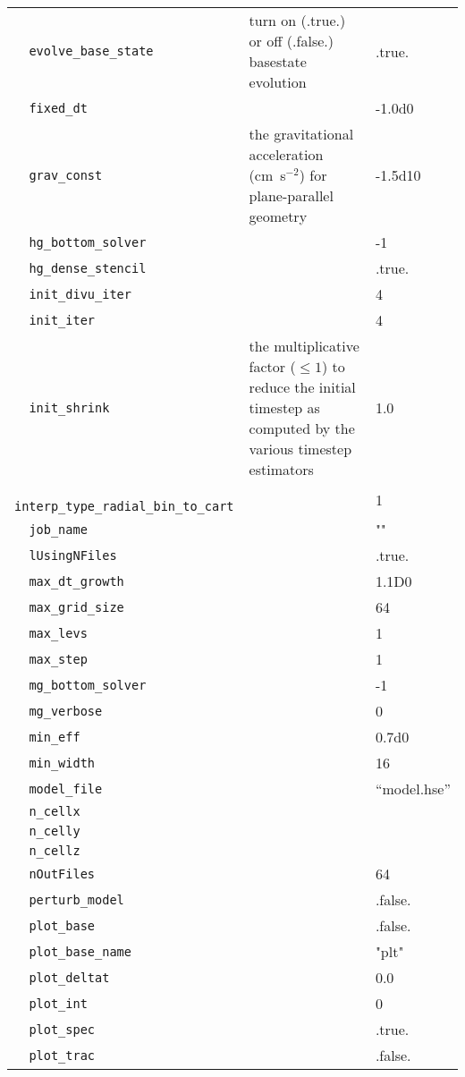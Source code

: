 {\begin{center}
\begin{longtable}{|l|p{3.25in}|l|}
\verb=  evolve_base_state =  & turn on (.true.) or off (.false.) basestate evolution  &  .true. \\
\verb=  fixed_dt =  &   &  -1.0d0 \\
\verb=  grav_const =  & the gravitational acceleration (cm~s$^{-2}$) for plane-parallel geometry  &  -1.5d10 \\
\verb=  hg_bottom_solver =  &   &  -1 \\
\verb=  hg_dense_stencil =  &   &  .true. \\
\verb=  init_divu_iter =  &   &  4 \\
\verb=  init_iter =  &   &  4 \\
\verb=  init_shrink =  & the multiplicative factor ($\le 1$) to reduce the initial timestep as computed by the various timestep estimators   &  1.0 \\
\verb=  interp_type_radial_bin_to_cart =  &   &  1 \\
\verb=  job_name =  &   &  "" \\
\verb=  lUsingNFiles =  &   &  .true. \\
\verb=  max_dt_growth =  &   &  1.1D0 \\
\verb=  max_grid_size =  &   &  64 \\
\verb=  max_levs =  &   &  1 \\
\verb=  max_step =  &   & 1 \\
\verb=  mg_bottom_solver =  &   &  -1 \\
\verb=  mg_verbose =  &   &  0 \\
\verb=  min_eff =  &   &  0.7d0 \\
\verb=  min_width =  &   &  16 \\
\verb=  model_file =  &   & ``model.hse'' \\
\verb=  n_cellx =  &   &  \\
\verb=  n_celly =  &   &  \\
\verb=  n_cellz =  &   &  \\
\verb=  nOutFiles =  &   & 64 \\
\verb=  perturb_model =  &   &  .false. \\
\verb=  plot_base =  &   & .false. \\
\verb=  plot_base_name =  &   &  "plt" \\
\verb=  plot_deltat =  &   &  0.0 \\
\verb=  plot_int =  &   & 0 \\
\verb=  plot_spec =  &   & .true. \\
\verb=  plot_trac =  &   & .false. \\

\end{longtable}
\end{center}}
